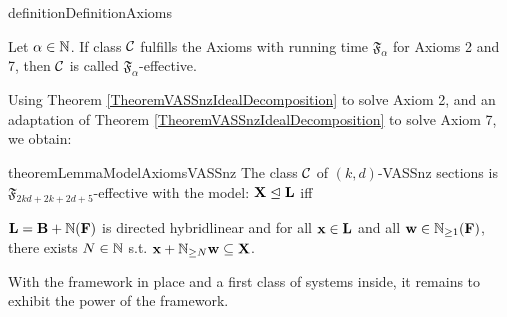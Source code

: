 \begin{restatable}{definition}{DefinitionAxioms}
\begin{enumerate}
\end{enumerate}

Let \(\alpha \in \mathbb{N}\). If class \(\mathcal{C}\) fulfills the Axioms with running time \(\mathfrak{F}_{\alpha}\) for Axioms 2 and 7, then \(\mathcal{C}\) is called \(\mathfrak{F}_{\alpha}\)-effective.
\end{restatable}

Using Theorem \ref{TheoremVASSnzIdealDecomposition} to solve Axiom 2, and an adaptation of Theorem \ref{TheoremVASSnzIdealDecomposition} to solve Axiom 7, we obtain:

\begin{restatable}{theorem}{LemmaModelAxiomsVASSnz} \label{TheoremModelAxiomsVASSnz}
The class \(\mathcal{C}\) of \((k,d)\)-VASSnz sections is \(\mathfrak{F}_{2kd+2k+2d+5}\)-effective with the model: \(\mathbf{X} \trianglelefteq \mathbf{L}\) iff 

\(\mathbf{L}=\mathbf{B}+\mathbb{N}(\mathbf{F})\) is directed hybridlinear and for all \(\mathbf{x} \in \mathbf{L}\) and all \(\mathbf{w} \in \mathbb{N}_{\geq 1}(\mathbf{F})\), there exists \(N \in \mathbb{N}\) s.t. \(\mathbf{x}+\mathbb{N}_{\geq N} \mathbf{w} \subseteq \mathbf{X}\).
\end{restatable}

With the framework in place and a first class of systems inside, it remains to exhibit the power of the framework.

